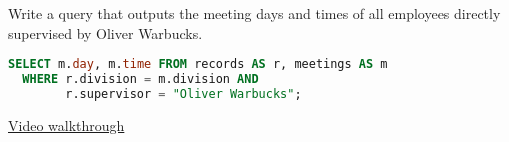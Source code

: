 \question Write a query that outputs the meeting days and times of all
employees directly supervised by Oliver Warbucks.
\begin{solution}[1in]
\begin{lstlisting}[language=SQL]
SELECT m.day, m.time FROM records AS r, meetings AS m
  WHERE r.division = m.division AND
        r.supervisor = "Oliver Warbucks";
\end{lstlisting}
\href{https://youtu.be/BIV5O1U9Zdw?t=9m}{Video walkthrough}
\end{solution}
